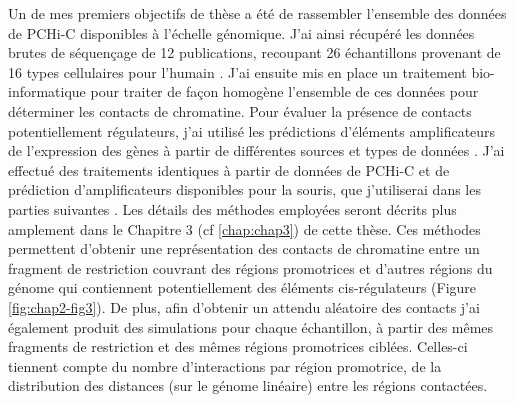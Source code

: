 Un de mes premiers objectifs de thèse a été de rassembler l’ensemble des données de \gls{PCHi-C} disponibles à l’échelle génomique. J’ai ainsi récupéré les données brutes de séquençage de 12 publications, recoupant 26 échantillons provenant de 16 types cellulaires pour l’humain \citep{choy_promoter_2018, freire-pritchett_global_2017, javierre_lineage-specific_2016, mifsud_mapping_2015, pan_integration_2018, rubin_lineage-specific_2017}. J’ai ensuite mis en place un traitement bio-informatique pour traiter de façon homogène l’ensemble de ces données pour déterminer les contacts de chromatine. Pour évaluer la présence de contacts potentiellement régulateurs, j’ai utilisé les prédictions d'éléments amplificateurs de l’expression des gènes à partir de différentes sources et types de données \citep{andersson_atlas_2014, roadmap_epigenomics_consortium_integrative_2015, hait_focs_2018}. J’ai effectué des traitements identiques à partir de données de \gls{PCHi-C} et de prédiction d’amplificateurs disponibles pour la souris, que j’utiliserai dans les parties suivantes \citep{comoglio_thrombopoietin_2018, koohy_genome_2018, novo_long-range_2018, schoenfelder_pluripotent_2015, schoenfelder_divergent_2018, siersbaek_dynamic_2017}. Les détails des méthodes employées seront décrits plus amplement dans le Chapitre 3 (cf \ref{chap:chap3}) de cette thèse. Ces méthodes permettent d’obtenir une représentation des contacts de chromatine entre un fragment de restriction couvrant des régions promotrices et d’autres régions du génome qui contiennent potentiellement des éléments \gls{cis}-régulateurs (Figure \ref{fig:chap2-fig3}). De plus, afin d’obtenir un attendu aléatoire des contacts j’ai également produit des simulations pour chaque échantillon, à partir des mêmes fragments de restriction et des mêmes régions promotrices ciblées. Celles-ci tiennent compte du nombre d'interactions par région promotrice, de la distribution des distances (sur le génome linéaire) entre les régions contactées.


